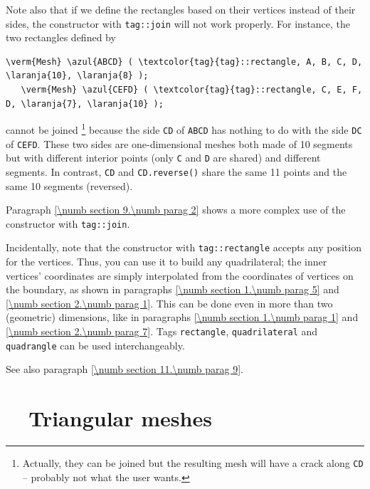 Note also that if we define the rectangles based on their vertices instead of their sides, 
the {\small\tt {}} constructor with {\small\tt \textcolor{tag}{tag}::join} will not work properly. 
For instance, the two rectangles defined by

\begin{Verbatim}[commandchars=\\\{\},formatcom=\small\tt,baselinestretch=0.94]
   \verm{Mesh} \azul{ABCD} ( \textcolor{tag}{tag}::rectangle, A, B, C, D, \laranja{10}, \laranja{8} );
   \verm{Mesh} \azul{CEFD} ( \textcolor{tag}{tag}::rectangle, C, E, F, D, \laranja{7}, \laranja{10} );
\end{Verbatim}

\noindent cannot be joined%
\footnote {Actually, they can be joined but the resulting mesh will have
a crack along {\small\tt CD} -- probably not what the user wants.}
because the side {\small\tt CD} of {\small\tt ABCD} has nothing to do with the side 
{\small\tt DC} of {\small\tt CEFD}.
These two sides are one-dimensional meshes both made of 10 segments but with different
interior points (only {\small\tt C} and {\small\tt D} are shared) and different segments.
In contrast, {\small\tt CD} and {\small\tt CD.reverse()} share the same 11 points and
the same 10 segments (reversed).

Paragraph \ref{\numb section 9.\numb parag 2} shows a more complex use of the {\small\tt {}}
constructor with {\small\tt \textcolor{tag}{tag}::join}.

Incidentally, note that the {\small\tt {}} constructor with {\small\tt \textcolor{tag}{tag}::rectangle} accepts
any position for the vertices. 
Thus, you can use it to build any quadrilateral; the inner vertices' coordinates are simply
interpolated from the coordinates of vertices on the boundary, as shown in paragraphs
\ref{\numb section 1.\numb parag 5} and \ref{\numb section 2.\numb parag 1}.
This can be done even in more than two (geometric) dimensions, like in
paragraphs \ref{\numb section 1.\numb parag 1} and \ref{\numb section 2.\numb parag 7}.
Tags {\small\tt rectangle}, {\small\tt quadrilateral} and {\small\tt quadrangle} can be used
interchangeably.

See also paragraph \ref{\numb section 11.\numb parag 9}.


\section{~~Triangular meshes}\label{\numb section 1.\numb parag 4}

